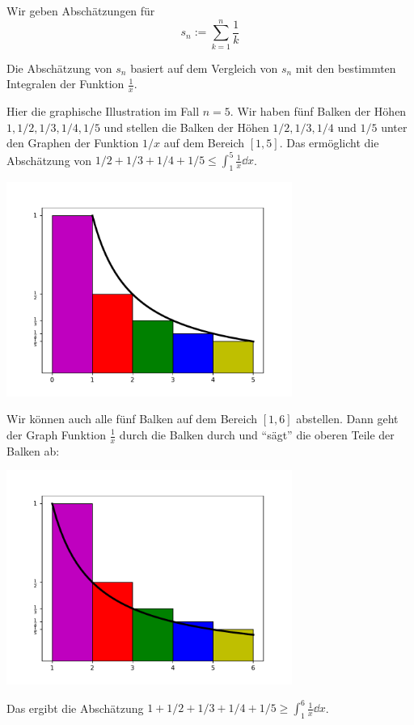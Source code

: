 \begin{bsp}
	Wir geben Abschätzungen für 
	\[
		s_n := \sum_{k=1}^n \frac{1}{k}
	\]
	
	Die Abschätzung von $s_n$ basiert auf dem Vergleich von $s_n$ mit den bestimmten Integralen der Funktion $\frac{1}{x}$. 
	
	
	Hier die graphische Illustration im Fall $n=5$. Wir haben fünf Balken der Höhen $1, 1/2, 1/3, 1/4, 1/5$ und stellen die Balken der Höhen $1/2,1/3,1/4$ und $1/5$ unter den Graphen der Funktion $1/x$ auf dem Bereich $[1,5]$. Das ermöglicht die Abschätzung von $1/2+1/3 + 1/4 + 1/5 \le \int_1^5 \frac{1}{x} \dd x$. 
	\begin{center} 
		\includegraphics[width=0.7\textwidth]{pics/harmonic_number_upper.pdf}
	\end{center} 

	Wir können auch alle fünf Balken auf dem Bereich $[1,6]$ abstellen. Dann geht der Graph Funktion $\frac{1}{x}$ durch die Balken durch und ``sägt'' die oberen Teile der Balken ab: 
	\begin{center} 
	\includegraphics[width=0.7\textwidth]{pics/harmonic_number_lower.pdf}
\end{center} 
	Das ergibt die Abschätzung $1 + 1/2 + 1/3 + 1/4 + 1/5 \ge \int_1^6 \frac{1}{x} \dd x$.


\end{bsp}
